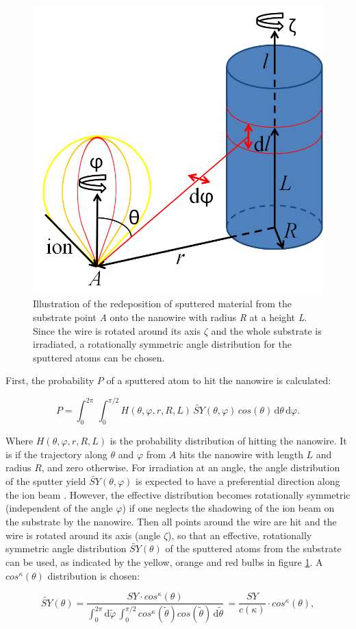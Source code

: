\begin{figure}
	\centering
		\includegraphics[width=.4\textwidth]{images/redeposit.jpg}
	\caption{Illustration of the redeposition of sputtered material from the substrate point \emph{A} onto the nanowire with radius \emph{R} at a height \emph{L}. Since the wire is rotated around its axis $\zeta$ and the whole substrate is irradiated, a rotationally symmetric angle distribution for the sputtered atoms can be chosen.} 
	\label{redeposit}
\end{figure}

First, the probability $P$ of a sputtered atom to hit the nanowire is calculated:

\begin{equation}
\label{prob1}
P = \int_0^{2\pi} \! \,\int_0^{\pi/2} \!\! H(\theta,\varphi,r,R,L) \, \tilde{SY}(\theta,\varphi) \,cos(\theta)\,\mathrm{d}\theta \, \mathrm{d}\varphi.
\end{equation}

Where $H(\theta,\varphi,r,R,L)$ is the probability distribution of hitting the nanowire. It is  if the trajectory along $\theta$ and $\varphi$ from $A$ hits the nanowire with length $L$ and radius $R$, and zero otherwise. For irradiation at an angle, the angle distribution of the sputter yield $\tilde{SY}(\theta,\varphi)$ is expected to have a preferential direction along the ion beam \cite{verdeil_angular_2008}. However, the effective distribution becomes rotationally symmetric (independent of the angle $\varphi$) if one neglects the shadowing of the ion beam on the substrate by the nanowire. Then all points around the wire are hit and the wire is rotated around its axis (angle $\zeta$), so that an effective, rotationally symmetric angle distribution $\tilde{SY}(\theta)$ of the sputtered atoms from the substrate can be used, as indicated by the yellow, orange and red bulbs in figure \ref{redeposit}. A $cos^\kappa(\theta)$ distribution is chosen: 

\begin{equation}
\tilde{SY}(\theta) = \frac{SY \cdot cos^\kappa(\theta)}{\int_0^{2\pi} \! \mathrm{d}\tilde\varphi \,\int_0^{\pi/2} \! cos^\kappa(\tilde\theta) cos(\tilde\theta)\,  \mathrm{d}\tilde\theta} \, = \frac{SY}{c(\kappa)} \cdot cos^\kappa(\theta) ,
\end{equation}

